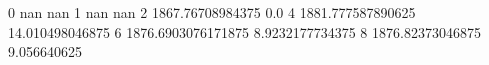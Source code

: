 0 nan nan
1 nan nan
2 1867.76708984375 0.0
4 1881.777587890625 14.010498046875
6 1876.6903076171875 8.9232177734375
8 1876.82373046875 9.056640625
